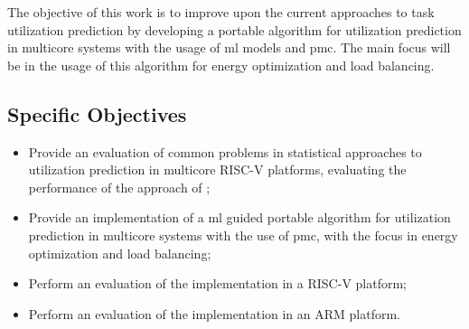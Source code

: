 The objective of this work is to improve upon the current approaches to task utilization prediction by developing a portable algorithm for utilization prediction in multicore systems with the usage of \gls{ml} models and \gls{pmc}. The main focus will be in the usage of this algorithm for energy optimization and load balancing.

\subsection{Specific Objectives}

\begin{itemize}
    \item Provide an evaluation of common problems in statistical approaches to utilization prediction in multicore RISC-V platforms, evaluating the performance of the approach of \textcite{hoffmann2021online};
    \item Provide an implementation of a \gls{ml} guided portable algorithm for utilization prediction in multicore systems with the use of \gls{pmc}, with the focus in energy optimization and load balancing;
    \item Perform an evaluation of the implementation in a RISC-V platform;
    \item Perform an evaluation of the implementation in an ARM platform.
\end{itemize}
